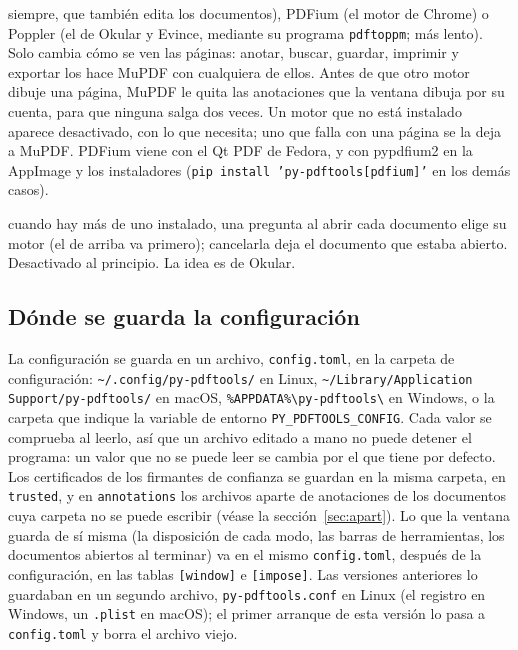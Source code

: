 \documentclass[12pt,
              article,
              oneside
              ]{memoir}
\begin{document}
\begin{description}
  siempre, que también edita los documentos), PDFium (el motor de Chrome)
  o Poppler (el de Okular y Evince, mediante su programa \texttt{pdftoppm};
  más lento). Solo cambia cómo se ven las páginas: anotar, buscar, guardar,
  imprimir y exportar los hace MuPDF con cualquiera de ellos. Antes de que
  otro motor dibuje una página, MuPDF le quita las anotaciones que la
  ventana dibuja por su cuenta, para que ninguna salga dos veces. Un motor
  que no está instalado aparece desactivado, con lo que necesita; uno que
  falla con una página se la deja a MuPDF. PDFium viene con el Qt PDF de
  Fedora, y con pypdfium2 en la AppImage y los instaladores
  (\texttt{pip install 'py-pdftools[pdfium]'} en los demás casos).
\item[Preguntar qué motor al abrir un documento] cuando hay más de uno
  instalado, una pregunta al abrir cada documento elige su motor (el de
  arriba va primero); cancelarla deja el documento que estaba abierto.
  Desactivado al principio. La idea es de Okular.
\end{description}

\subsection{Dónde se guarda la configuración}
\label{sec:files-kept}

%
La configuración se guarda en un archivo, \texttt{config.toml}, en la
carpeta de configuración: \texttt{\textasciitilde/.config/py-pdftools/} en
Linux, \texttt{\textasciitilde/Library/Application Support/py-pdftools/} en
macOS, \texttt{\%APPDATA\%\textbackslash py-pdftools\textbackslash} en
Windows, o la carpeta que indique la variable de entorno
\texttt{PY\_PDFTOOLS\_CONFIG}. Cada valor se comprueba al leerlo, así que
un archivo editado a mano no puede detener el programa: un valor que no se
puede leer se cambia por el que tiene por defecto. Los certificados de los
firmantes de confianza se guardan en la misma carpeta, en
\texttt{trusted}, y en \texttt{annotations} los archivos aparte de
anotaciones de los documentos cuya carpeta no se puede escribir (véase la
sección~\ref{sec:apart}). Lo que la ventana guarda de sí misma (la disposición de
cada modo, las barras de herramientas, los documentos abiertos al
terminar) va en el mismo \texttt{config.toml}, después de la
configuración, en las tablas \texttt{[window]} e \texttt{[impose]}. Las
versiones anteriores lo guardaban en un segundo archivo,
\texttt{py-pdftools.conf} en Linux (el registro en Windows, un
\texttt{.plist} en macOS); el primer arranque de esta versión lo pasa a
\texttt{config.toml} y borra el archivo viejo.
\end{document}

